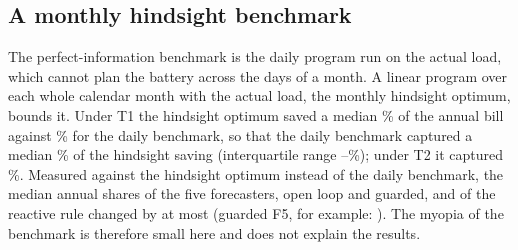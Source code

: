 \subsection{A monthly hindsight benchmark}\label{sec:explore-hind}
The perfect-information benchmark is the daily program run on the actual load, which cannot plan the battery across the days of a month. A linear program over each whole calendar month with the actual load, the monthly hindsight optimum, bounds it. Under T1 the hindsight optimum saved a median \% of the annual bill against \% for the daily benchmark, so that the daily benchmark captured a median \% of the hindsight saving (interquartile range --\%); under T2 it captured \%. Measured against the hindsight optimum instead of the daily benchmark, the median annual shares of the five forecasters, open loop and guarded, and of the reactive rule changed by at most  (guarded F5, for example: ). The myopia of the benchmark is therefore small here and does not explain the results.
